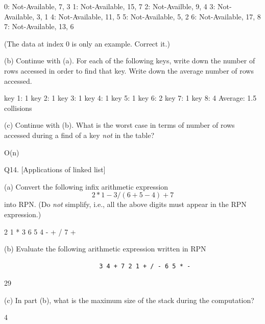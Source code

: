 \ANSWER
\begin{answercode}
0: {Not-Available, 7, 3}
1: {Not-Available, 15, 7}
2: {Not-Availble, 9, 4}
3: {Not-Available, 3, 1}
4: {Not-Available, 11, 5}
5: {Not-Available, 5, 2}
6: {Not-Available, 17, 8}
7: {Not-Available, 13, 6}
\end{answercode}
(The data at index 0 is only an example. Correct it.)

(b) Continue with (a).
For each of the following keys, write down the number of rows
accessed in order to find that key.
Write down the average number of rows accessed.
\\
\ANSWER
\begin{answercode}
key 1: 1
key 2: 1
key 3: 1
key 4: 1
key 5: 1
key 6: 2
key 7: 1
key 8: 4
Average: 1.5 collisions
\end{answercode}
  
(c) Continue with (b).
What is the worst case in terms of number of rows accessed
during a find of a key \textit{not} in the table?
\\
\ANSWER
\begin{answercode}
O(n)
\end{answercode}





\newpage
Q14. [Applications of linked list]

(a) Convert the following infix arithmetic expression
\[
  2 * 1 - 3 / (6 + 5 - 4) + 7 
\]
into RPN.
(Do \textit{not} simplify, i.e., all the above digits must appear
in the RPN expression.)
\\
\ANSWER
\begin{answercode}
2 1 * 3 6 5 4 - + / 7 +
\end{answercode}


(b) Evaluate the following arithmetic expression written in RPN
\begin{Verbatim}
                          3 4 + 7 2 1 + / - 6 5 * -
\end{Verbatim}
\ANSWER
\begin{answercode}
29
\end{answercode}

(c)
In part (b),
what is the maximum size of the stack during the computation?

\ANSWER
\begin{answercode}
4
\end{answercode}





